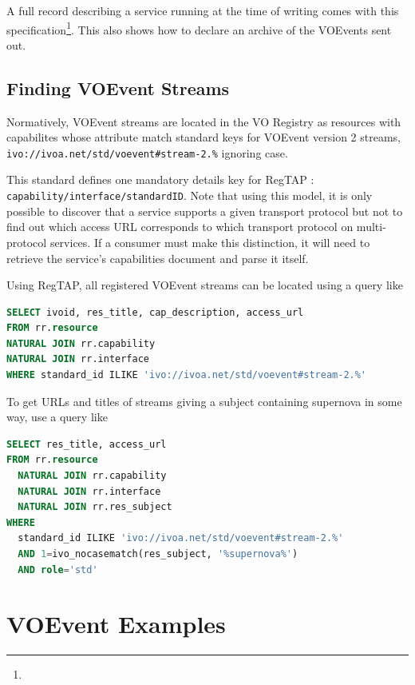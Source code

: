 \documentclass[11pt,a4paper]{ivoa}
\begin{document}
A full record describing a service running at the time of writing
comes with this
specification\footnote{}.  This also
shows how to declare an archive of the VOEvents sent out.

\subsection{Finding VOEvent Streams}

Normatively, VOEvent streams are located in the VO Registry as resources
with capabilites whose  attribute match standard
keys for VOEvent version 2 streams,
\nolinkurl{ivo://ivoa.net/std/voevent#stream-2.%} ignoring
case.

This standard defines one mandatory details key for RegTAP
\citep{2019ivoa.spec.1011D}: \verb|capability/interface/standardID|.
Note that using this model, it is only possible to discover that a
service supports a given transport protocol but not to find out which
access URL corresponds to which transport protocol on multi-protocol
services.  If a consumer must make this distinction, it will need to
retrieve the service's capabilities document and parse it itself.

Using RegTAP, all registered VOEvent streams
can be located using a query like

\begin{lstlisting}[language=SQL]
SELECT ivoid, res_title, cap_description, access_url
FROM rr.resource
NATURAL JOIN rr.capability
NATURAL JOIN rr.interface
WHERE standard_id ILIKE 'ivo://ivoa.net/std/voevent#stream-2.%'
\end{lstlisting}

To get URLs and titles of streams giving a subject containing supernova
in some way, use a query like

\begin{lstlisting}[language=SQL]
SELECT res_title, access_url
FROM rr.resource
  NATURAL JOIN rr.capability
  NATURAL JOIN rr.interface
  NATURAL JOIN rr.res_subject
WHERE
  standard_id ILIKE 'ivo://ivoa.net/std/voevent#stream-2.%'
  AND 1=ivo_nocasematch(res_subject, '%supernova%')
  AND role='std'
\end{lstlisting}

\section{VOEvent Examples}
\label{sec:4}
\end{document}
